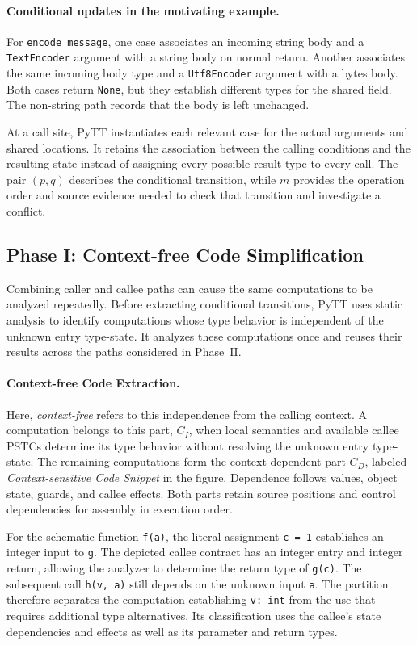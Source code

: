 \paragraph{Conditional updates in the motivating example.}
For \texttt{encode\_message}, one case associates an incoming string body
and a \texttt{TextEncoder} argument with a string body on normal return.
Another associates the same incoming body type and a \texttt{Utf8Encoder}
argument with a bytes body. Both cases return \texttt{None}, but they
establish different types for the shared field. The non-string path
records that the body is left unchanged.

At a call site, PyTT instantiates each relevant case for the actual
arguments and shared locations. It retains the association between the
calling conditions and the resulting state instead of assigning every
possible result type to every call. The pair $(p,q)$ describes the
conditional transition, while $m$ provides the operation order and source
evidence needed to check that transition and investigate a conflict.

\subsection{Phase I: Context-free Code Simplification}
\label{sec:extraction}
Combining caller and callee paths can cause the same computations to be
analyzed repeatedly. Before extracting conditional transitions, PyTT uses
static analysis to identify computations whose type behavior is independent
of the unknown entry type-state. It analyzes these computations once and
reuses their results across the paths considered in Phase~II.

\paragraph{Context-free Code Extraction.}
Here, \emph{context-free} refers to this independence from the calling
context. A computation belongs to this part, $C_I$, when
local semantics and available callee PSTCs determine its type behavior
without resolving the unknown entry type-state. The remaining computations
form the context-dependent part $C_D$, labeled \emph{Context-sensitive Code
Snippet} in the figure. Dependence follows values, object state, guards,
and callee effects. Both parts retain source positions and control
dependencies for assembly in execution order.

For the schematic function \texttt{f(a)}, the literal assignment
\texttt{c = 1} establishes an integer input to \texttt{g}. The depicted
callee contract has an integer entry and integer return, allowing the
analyzer to determine the return type of \texttt{g(c)}. The subsequent
call \texttt{h(v, a)} still depends on the unknown input \texttt{a}.
The partition therefore separates the computation establishing
\texttt{v: int} from the use that requires additional type alternatives.
Its classification uses the callee's state dependencies and effects as
well as its parameter and return types.

